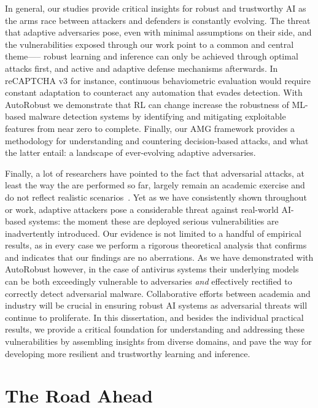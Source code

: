 In general, our studies provide critical insights for robust and trustworthy \gls{AI} as the arms race between attackers and defenders is constantly evolving.
The threat that adaptive adversaries pose, even with minimal assumptions on their side, and the vulnerabilities exposed through our work point to a common and central theme—-- robust learning and inference can only be achieved through optimal attacks first, and active and adaptive defense mechanisms afterwards.
In reCAPTCHA v3 for instance, continuous behaviometric evaluation would require constant adaptation to counteract any automation that evades detection.
With AutoRobust we demonstrate that \gls{RL} can change increase the robustness of ML-based malware detection systems by identifying and mitigating exploitable features from near zero to complete.
Finally, our AMG framework provides a methodology for understanding and countering decision-based attacks,  and what the latter entail: a landscape of ever-evolving adaptive adversaries.

Finally, a lot of researchers have pointed to the fact that adversarial attacks, at least the way the are performed so far, largely remain an academic exercise and do not reflect realistic scenarios~\cite{apruzzese2023real}.
Yet as we have consistently shown throughout or work, adaptive attackers pose a considerable threat against real-world AI-based systems: the moment these are deployed serious vulnerabilities are inadvertently introduced.
Our evidence is not limited to a handful of empirical results, as in every case we perform a rigorous theoretical analysis that confirms and indicates that our findings are no aberrations.
As we have demonstrated with AutoRobust however, in the case of antivirus systems their underlying models can be both exceedingly vulnerable to adversaries \textit{and} effectively rectified to correctly detect adversarial malware.
Collaborative efforts between academia and industry will be crucial in ensuring robust \gls{AI} systems as adversarial threats will continue to proliferate.
In this dissertation, and besides the individual practical results, we provide a critical foundation for understanding and addressing these vulnerabilities by assembling insights from diverse domains, and pave the way for developing more resilient and trustworthy learning and inference.

\section{The Road Ahead}


